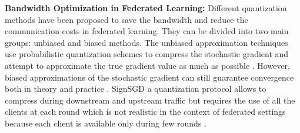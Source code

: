 \documentclass[accepted]{uai2021} %
\begin{document}
\noindent \textbf{Bandwidth Optimization in Federated Learning:}
Different quantization methods have been proposed to save the bandwidth and reduce the communication costs in federated learning. They can be divided into two main groups: unbiased and biased methods. The unbiased approximation techniques use probabilistic quantization schemes to compress the stochastic gradient and attempt to approximate the true gradient value as much as possible \citep{QSGD, TERNGRAD, ATOMO, Quant_Fed}. 
However, biased approximations of the stochastic gradient can still guarantee convergence both in theory and practice \citep{SIGNSGD, LinHM0D18, SeideFDLY14}. %
SignSGD \cite{SIGNSGD} a quantization protocol allows to compress during downstream and upstream traffic but requires the use of all the clients at each round which is not realistic in the context of federated settings because each client is available only during few rounds \cite{kairouz2019advances}.
\end{document}
